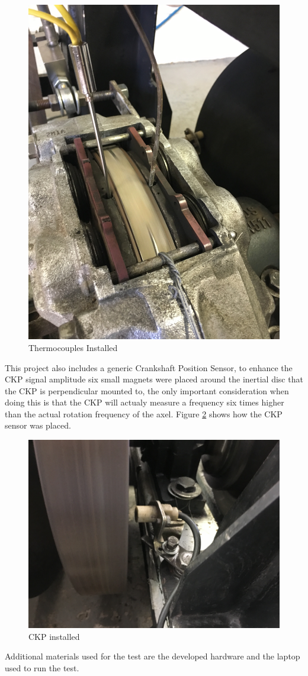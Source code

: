 		\begin{figure}[htbp]
			\centering
			\includegraphics[width=.5\textwidth, angle=270]{figuras/fig-thermocouple-installation}
			\caption{Thermocouples Installed}
			\label{fig:thermocouple-installation}
		\end{figure}
		\par

		This project also includes a generic Crankshaft Position Sensor, to enhance the CKP signal amplitude six small magnets were placed around the inertial disc that the CKP is perpendicular mounted to, the only important consideration when doing this is that the CKP will actualy measure a frequency six times higher than the actual rotation frequency of the axel. Figure \ref{fig:ckp-installed} shows how the CKP sensor was placed.

		\begin{figure}[htbp]
			\centering
			\includegraphics[width=.5\textwidth]{figuras/fig-ckp-installed}
			\caption{CKP installed}
			\label{fig:ckp-installed}
		\end{figure}
		\par

		Additional materials used for the test are the developed hardware and the laptop used to run the test.